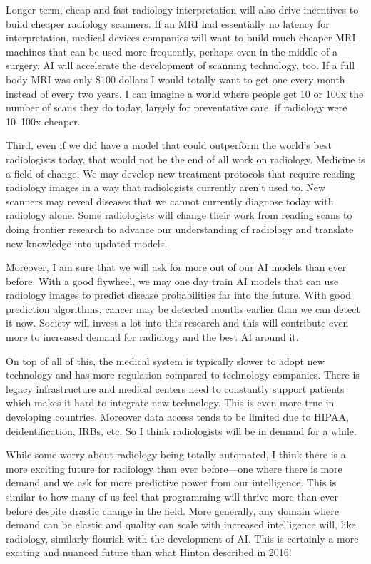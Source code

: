 \documentclass[11pt]{article}
\begin{document}
Longer term, cheap and fast radiology interpretation will also drive incentives to build cheaper radiology scanners. If an MRI had essentially no latency for interpretation, medical devices companies will want to build much cheaper MRI machines that can be used more frequently, perhaps even in the middle of a surgery. AI will accelerate the development of scanning technology, too. If a full body MRI was only \$100 dollars I would totally want to get one every month instead of every two years. I can imagine a world where people get 10 or 100x the number of scans they do today, largely for preventative care, if radiology were 10--100x cheaper.

Third, even if we did have a model that could outperform the world's best radiologists today, that would not be the end of all work on radiology. Medicine is a field of change. We may develop new treatment protocols that require reading radiology images in a way that radiologists currently aren't used to. New scanners may reveal diseases that we cannot currently diagnose today with radiology alone. Some radiologists will change their work from reading scans to doing frontier research to advance our understanding of radiology and translate new knowledge into updated models.

Moreover, I am sure that we will ask for more out of our AI models than ever before. With a good flywheel, we may one day train AI models that can use radiology images to predict disease probabilities far into the future. With good prediction algorithms, cancer may be detected months earlier than we can detect it now. Society will invest a lot into this research and this will contribute even more to increased demand for radiology and the best AI around it.

On top of all of this, the medical system is typically slower to adopt new technology and has more regulation compared to technology companies. There is legacy infrastructure and medical centers need to constantly support patients which makes it hard to integrate new technology. This is even more true in developing countries. Moreover data access tends to be limited due to HIPAA, deidentification, IRBs, etc. So I think radiologists will be in demand for a while.

While some worry about radiology being totally automated, I think there is a more exciting future for radiology than ever before---one where there is more demand and we ask for more predictive power from our intelligence. This is similar to how many of us feel that programming will thrive more than ever before despite drastic change in the field. More generally, any domain where demand can be elastic and quality can scale with increased intelligence will, like radiology, similarly flourish with the development of AI. This is certainly a more exciting and nuanced future than what Hinton described in 2016!
\end{document}
